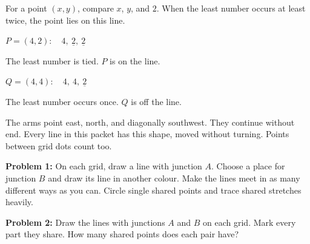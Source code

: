 \documentclass[12pt,letterpaper]{article}
\newcommand{\problem}[2]{\par\noindent\textbf{Problem #1:} #2\par}
\begin{document}
For a point $(x,y)$, compare $x$, $y$, and $2$. When the least number occurs at least twice, the point lies on this line.
\vspace{-2pt}
\begin{center}
\begin{minipage}[c]{.36\linewidth}\centering
{}
\end{minipage}\hfill
\begin{minipage}[c]{.60\linewidth}
$P=(4,2):\quad 4,\ \underline{2},\ \underline{2}$\par
The least number is tied. $P$ is on the line.\par\vspace{5pt}
$Q=(4,4):\quad 4,\ 4,\ \underline{2}$\par
The least number occurs once. $Q$ is off the line.
\end{minipage}
\end{center}
\vspace{-5pt}
The arms point east, north, and diagonally southwest. They continue without end. Every line in this packet has this shape, moved without turning. Points between grid dots count too.
\problem{1}{On each grid, draw a line with junction $A$. Choose a place for junction $B$ and draw its line in another colour. Make the lines meet in as many different ways as you can. Circle single shared points and trace shared stretches heavily.}
\vspace{1pt}
\TrialBoards
\newpage
\problem{2}{Draw the lines with junctions $A$ and $B$ on each grid. Mark every part they share. How many shared points does each pair have?}
\vspace{5pt}
\end{document}
